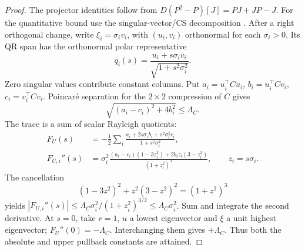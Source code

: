 \begin{proof}
The projector identities follow from $D(P^2-P)[J]=PJ+JP-J$.
For the quantitative bound use the singular-vector/CS decomposition
\citep[Chapters 2 and 8]{golub2013matrix}. After a right orthogonal change,
write $\xi_i=\sigma_iv_i$, with $(u_i,v_i)$ orthonormal for each
$\sigma_i>0$. Its QR span has the orthonormal polar representative
\begin{equation}
 q_i(s)=\frac{u_i+s\sigma_iv_i}{\sqrt{1+s^2\sigma_i^2}}.
\end{equation}
Zero singular values contribute constant columns.
Put $a_i=u_i^\top Cu_i$, $b_i=u_i^\top Cv_i$, $c_i=v_i^\top Cv_i$.
Poincar\'e separation for the $2\times2$ compression of $C$ gives
\begin{equation}
 \sqrt{(a_i-c_i)^2+4b_i^2}\le\Lambda_C.
\end{equation}
The trace is a sum of scalar Rayleigh quotients:
\begin{align}
 F_U(s)&=-\frac12\sum_i
       \frac{a_i+2s\sigma_ib_i+s^2\sigma_i^2c_i}{1+s^2\sigma_i^2},\\
 F_{U,i}''(s)&=\sigma_i^2
 \frac{(a_i-c_i)(1-3z_i^2)+2b_i z_i(3-z_i^2)}{(1+z_i^2)^3},
 \qquad z_i=s\sigma_i.
\end{align}
The cancellation
\begin{equation}
 (1-3z^2)^2+z^2(3-z^2)^2=(1+z^2)^3
\end{equation}
yields $|F_{U,i}''(s)|\le
\Lambda_C\sigma_i^2/(1+z_i^2)^{3/2}\le\Lambda_C\sigma_i^2$.
Sum and integrate the second derivative. At $s=0$, take $r=1$,
$u$ a lowest eigenvector and $\xi$ a unit highest eigenvector;
$F_U''(0)=-\Lambda_C$. Interchanging them gives $+\Lambda_C$.
Thus both the absolute and upper pullback constants are attained.
\end{proof}

